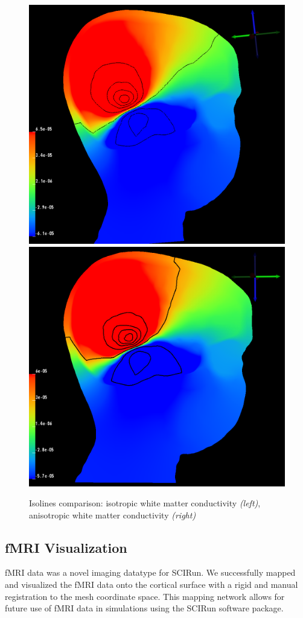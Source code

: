 \begin{figure}[H]
\begin{center}
\includegraphics[width=.49\textwidth]{Figures/iso_isolines}
\includegraphics[width = .49\textwidth]{Figures/aniso_isolines}
\caption{Isolines comparison: isotropic white matter conductivity \textit{(left)}, anisotropic white matter conductivity \textit{(right)}}
\label{fig:isolines}
\end{center}
\end{figure}

\subsection{fMRI Visualization}

fMRI data was a novel imaging datatype for SCIRun. We successfully mapped and visualized the fMRI data onto the cortical surface with a rigid and manual registration to the mesh coordinate space. This mapping network allows for future use of fMRI data in simulations using the SCIRun software package.

